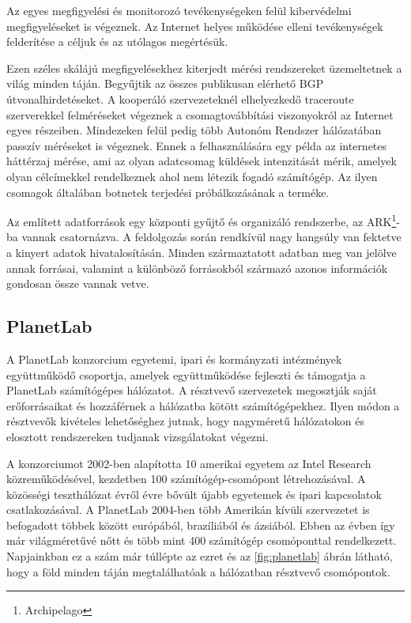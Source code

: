 Az egyes megfigyelési és monitorozó tevékenységeken felül kibervédelmi megfigyeléseket is végeznek. Az Internet helyes működése elleni tevékenységek felderítése a céljuk és az utólagos megértésük.


Ezen széles skálájú megfigyelésekhez kiterjedt mérési rendszereket üzemeltetnek a világ minden táján. Begyűjtik az összes publikusan elérhető BGP útvonalhirdetéseket. A kooperáló szervezeteknél elhelyezkedő traceroute szerverekkel felméréseket végeznek a csomagtovábbítási viszonyokról az Internet egyes részeiben. Mindezeken felül pedig több Autonóm Rendszer hálózatában passzív méréseket is végeznek. Ennek a felhasználására egy példa az internetes háttérzaj mérése, ami az olyan adatcsomag küldések intenzitását mérik, amelyek olyan célcímekkel rendelkeznek ahol nem létezik fogadó számítógép. Az ilyen csomagok általában botnetek terjedési próbálkozásának a terméke.

Az említett adatforrások egy központi gyűjtő és organizáló rendszerbe, az ARK\footnote{Archipelago}-ba vannak csatornázva. A feldolgozás során rendkívül nagy hangsúly van fektetve a kinyert adatok hivatalosításán. Minden származtatott adatban meg van jelölve annak forrásai, valamint a különböző forrásokból származó azonos információk gondosan össze vannak vetve.





\subsection{PlanetLab}

A PlanetLab konzorcium egyetemi, ipari és kormányzati intézmények együttműködő csoportja, amelyek együttműködése fejleszti és támogatja a PlanetLab számítógépes hálózatot. A résztvevő szervezetek megosztják saját erőforrásaikat és hozzáférnek a hálózatba kötött számítógépekhez. Ilyen módon a résztvevők kivételes lehetőséghez jutnak, hogy  nagyméretű hálózatokon és elosztott rendszereken tudjanak vizsgálatokat végezni.

A konzorciumot 2002-ben alapította 10 amerikai egyetem az Intel Research közreműködésével, kezdetben 100 számítógép-csomópont létrehozásával. A közösségi teszthálózat évről évre bővült újabb egyetemek és ipari kapcsolatok csatlakozásával. A PlanetLab 2004-ben több Amerikán kívüli szervezetet is befogadott többek között európából, brazíliából és ázsiából. Ebben az évben így már világméretűvé nőtt és több mint 400 számítógép csomóponttal rendelkezett. Napjainkban ez a szám már túllépte az ezret és az \ref{fig:planetlab} ábrán látható, hogy a föld minden táján megtalálhatóak a hálózatban résztvevő csomópontok.

